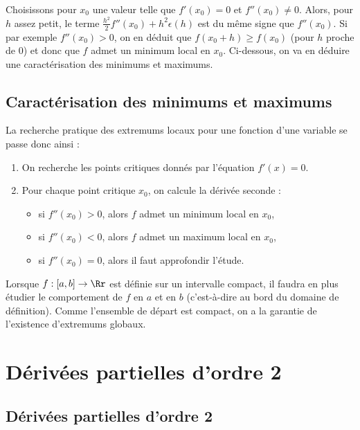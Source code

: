 \documentclass[11pt, class=report,crop=false]{standalone}
\begin{document}
Choisissons pour $x_0$ une valeur telle que $f'(x_0)=0$ et $f''(x_0)\neq 0$. 
Alors, pour $h$ assez petit, le terme $ \frac{h^2}{2} f''(x_0) + h^2 \epsilon (h)$ est du même signe que $f''(x_0)$. Si par exemple $f''(x_0)>0$, on en déduit que $f(x_0 + h) \ge f(x_0)$ (pour $h$ proche de $0$) et donc que $f$ admet un minimum local en $x_0$.
Ci-dessous, on va en déduire une caractérisation des minimums et maximums.

\subsection{Caractérisation des minimums et maximums}

La recherche pratique des extremums locaux pour une fonction d'une variable se passe donc ainsi :
\begin{enumerate}
    \item On recherche les points critiques donnés par l'équation $f'(x) = 0$.
    \item Pour chaque point critique $x_0$, on calcule la dérivée seconde :
    \begin{itemize}
        \item si $f''(x_0) > 0$, alors $f$ admet un minimum local en $x_0$,   
        \item si $f''(x_0) < 0$, alors $f$ admet un maximum local en $x_0$,
        \item si $f''(x_0) = 0$, alors  il faut approfondir l'étude.
    \end{itemize}    
\end{enumerate}
    
Lorsque $f : [a,b] \to \Rr$ est définie sur un intervalle compact, il faudra en plus étudier le comportement de $f$ en $a$ et en $b$ (c'est-à-dire au bord du domaine de définition). Comme l'ensemble de départ est compact, on a la garantie de l'existence d'extremums globaux.
    

\section{Dérivées partielles d'ordre 2}

\subsection{Dérivées partielles d'ordre 2}
\end{document}
